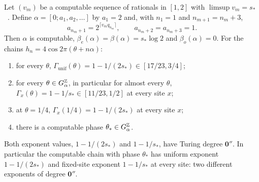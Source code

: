 \begin{corollary}\label{cor:twoexp}
Let $(v_m)$ be a computable sequence of rationals in $[1,2]$ with $\limsup v_m=s_*$~\cite[Lemma~11.1]{DMamo}. Define $\alpha=[0;a_1,a_2,\dots]$ by $a_1=2$ and, with $n_1=1$ and $n_{m+1}=n_m+3$,
\[
a_{n_m+1}=2^{\lceil v_mq_{n_m}\rceil},\qquad a_{n_m+2}=a_{n_m+3}=1 .
\]
Then $\alpha$ is computable, $\beta_e(\alpha)=\beta(\alpha)=s_*\log2$ and $\beta_o(\alpha)=0$. For the chains $h_n=4\cos2\pi(\theta+n\alpha)$:
\begin{enumerate}
\item for every $\theta$, $\Gamma_{\mathrm{unif}}(\theta)=1-1/(2s_*)\in[17/23,3/4]$;
\item for every $\theta\in G_\alpha^\mathbb Z$, in particular for almost every $\theta$, $\Gamma_x(\theta)=1-1/s_*\in[11/23,1/2]$ at every site $x$;
\item at $\theta=1/4$, $\Gamma_x(1/4)=1-1/(2s_*)$ at every site $x$;
\item there is a computable phase $\theta_*\in G_\alpha^\mathbb Z$.
\end{enumerate}
Both exponent values, $1-1/(2s_*)$ and $1-1/s_*$, have Turing degree $\mathbf 0''$. In particular the computable chain with phase $\theta_*$ has uniform exponent $1-1/(2s_*)$ and fixed-site exponent $1-1/s_*$ at every site: two different exponents of degree $\mathbf 0''$.
\end{corollary}


